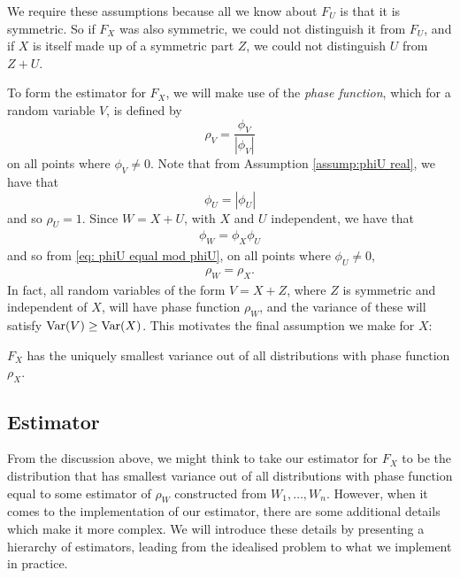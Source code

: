 	We require these assumptions because all we know about $F_U$ is that it is symmetric. So if $F_X$ was also symmetric, we could not distinguish it from $F_U$, and if $X$ is itself made up of a symmetric part $Z$, we could not distinguish $U$ from $Z+U$.


	To form the estimator for $F_X$, we will make use of the \emph{phase function}, which for a random variable $V$, is defined by
	\begin{equation}
		\rho_V = \frac{\phi_V}{|\phi_V|}
	\end{equation}
	on all points where $\phi_V \neq 0$.
	Note that from Assumption \ref{assump:phiU real}, we have that 
	\begin{equation}
	\label{eq: phiU equal mod phiU}
		\phi_U = |\phi_U|
	\end{equation}
	and so $\rho_U = 1$.
	Since $W = X+U$, with $X$ and $U$ independent, we have that
	\begin{align}
		\phi_W = \phi_X \phi_U
	\end{align}
	and so from \eqref{eq: phiU equal mod phiU}, on all points where $\phi_U \neq 0$,
	\begin{align}
		\rho_W = \rho_X.
	\end{align}
	In fact, all random variables of the form $V = X + Z$, where $Z$ is symmetric and independent of $X$, will have phase function $\rho_W$, and the variance of these will satisfy $\mathrm{Var}(V) \geq \mathrm{Var}(X)$. This motivates the final assumption we make for $X$:

	\begin{assumption}
	\label{assump:X has smallest variance}
		$F_X$ has the uniquely smallest variance out of all distributions with phase function $\rho_X$.
	\end{assumption}

	\subsection{Estimator}
	\label{sec:deconvolution estimator}
	From the discussion above, we might think to take our estimator for $F_X$ to be the distribution that has smallest variance out of all distributions with phase function equal to some estimator of $\rho_W$ constructed from $W_1, \dots, W_n$. However, when it comes to the implementation of our estimator, there are some additional details which make it more complex. We will introduce these details by presenting a hierarchy of estimators, leading from the idealised problem to what we implement in practice. 

